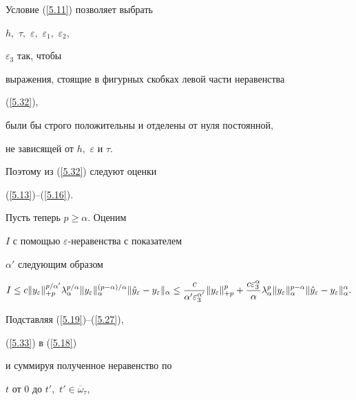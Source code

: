 \begin{pf}
Условие (\ref{5.11}) позволяет  выбрать


$h,$ $\tau,$ $\varepsilon,$ $\varepsilon _{1},$ $\varepsilon _{2},$


$\varepsilon _{3} $  так, чтобы


выражения, стоящие в фигурных скобках левой части неравенства


(\ref{5.32}),


были бы строго положительны и отделены от нуля постоянной,


не зависящей от $ h,$ $\varepsilon $ и $ \tau $.


Поэтому из (\ref{5.32}) следуют оценки


(\ref{5.13})--(\ref{5.16}).





Пусть теперь $ p \ge \alpha $. Оценим


$I $ с помощью  $\varepsilon$-неравенства с показателем


$\alpha '$ следующим образом


\begin{equation}


I \le  c


\|  y_\varepsilon \| ^{p/\alpha '}_{+p}


\lambda ^{p/\alpha }_{\alpha }


\|  y_\varepsilon \| ^{(p-\alpha )/\alpha }_{\alpha }


\|  \Hat{y}_\varepsilon-y_\varepsilon \| _{\alpha }


\le


\frac{c}{\alpha '\varepsilon^{\alpha '}_{3}}


\|  y_\varepsilon \| ^{p}_{+p} +


\frac{c\varepsilon^{\alpha}_{3} }{\alpha }\lambda^{p}_{\alpha}


\| y_\varepsilon


\|^{p-\alpha}_{\alpha}


\| \Hat{y}_\varepsilon -y_\varepsilon\|^{\alpha}_{\alpha}.


\label{5.33}


\end{equation}


Подставляя (\ref{5.19})--(\ref{5.27}),


(\ref{5.33}) в (\ref{5.18})


и суммируя полученное неравенство по


$t $ от 0 до $t',$ $ t' \in \overline{\omega}_{\tau} $,



\end{pf}

